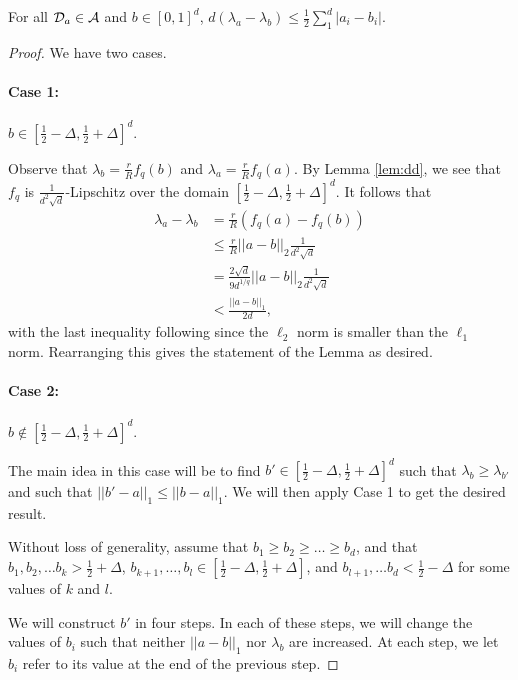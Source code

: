 \begin{lem}\label{lem:loss_bound_clever}
For all ${\mathcal D}_a \in \mathcal{A}$ and $b \in [0,1]^d$, $d(\lambda_a - \lambda_b) \leq \frac{1}{2}\sum_1^d |a_i - b_i|.$ 
\end{lem}

\begin{proof}
We have two cases.
\paragraph{Case 1:} $b \in [\frac{1}{2} - \Delta, \frac{1}{2} + \Delta]^d$.

Observe that $\lambda_b = \frac{r}{R}f_q(b)$ and $\lambda_a = \frac{r}{R}f_q(a)$. By Lemma \ref{lem:dd}, we see that $f_q$ is $\frac{1}{d^2\sqrt{d}}$-Lipschitz over the domain $[\frac{1}{2} - \Delta, \frac{1}{2} + \Delta]^d$. It follows that
\begin{equation*}
\begin{split}
\lambda_a - \lambda_b &= \frac{r}{R}(f_q(a) - f_q(b)) \\
&\leq \frac{r}{R}||a - b||_2\frac{1}{d^2\sqrt{d}} \\
&= \frac{2\sqrt{d}}{9d^{1/q}}||a - b||_2\frac{1}{d^2\sqrt{d}} \\
&< \frac{||a - b||_1}{2d},
\end{split}
\end{equation*}
with the last inequality following since the $\ell_2$ norm is smaller than the $\ell_1$ norm. Rearranging this gives the statement of the Lemma as desired.

\paragraph{Case 2: } $b \notin [\frac{1}{2} - \Delta, \frac{1}{2} + \Delta]^d$.

The main idea in this case will be to find $b' \in [\frac{1}{2} - \Delta, \frac{1}{2} + \Delta]^d$ such that $\lambda_b \geq \lambda_{b'}$ and such that $||b' - a||_1 \leq ||b - a||_1$. We will then apply Case 1 to get the desired result.

Without loss of generality, assume that $b_1 \geq b_2 \geq \dots \geq b_d$, and that $b_1, b_2, \dots b_k > \frac{1}{2} + \Delta$, $b_{k+1}, \dots, b_l \in [\frac{1}{2} - \Delta, \frac{1}{2} + \Delta]$, and $b_{l+1}, \dots b_d < \frac{1}{2} - \Delta$ for some values of $k$ and $l$. 

We will construct $b'$ in four steps. In each of these steps, we will change the values of $b_i$ such that neither $||a - b||_1$ nor $\lambda_b$ are increased. At each step, we let $b_i$ refer to its value at the end of the previous step. 



\end{proof}
